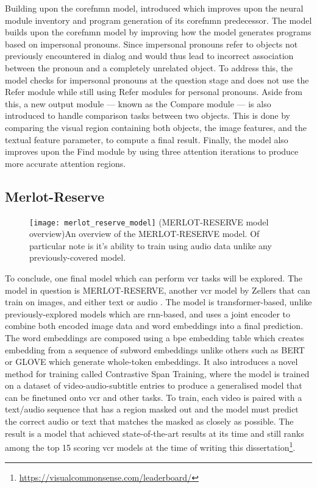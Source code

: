Building upon the \gls{corefnmn} model, \citeauthor{cho_visual_2021} introduced \cite{cho_visual_2021} which improves upon the neural module inventory and program generation of its \gls{corefnmn} predecessor.
The model builds upon the \gls{corefnmn} model by improving how the model generates programs based on impersonal pronouns.
Since impersonal pronouns refer to objects not previously encountered in dialog and would thus lead to incorrect association between the pronoun and a completely unrelated object.
To address this, the model checks for impersonal pronouns at the question stage and does not use the Refer module while still using Refer modules for personal pronouns.
Aside from this, a new output module --- known as the Compare module --- is also introduced to handle comparison tasks between two objects.
This is done by comparing the visual region containing both objects, the image features, and the textual feature parameter, to compute a final result.
Finally, the model also improves upon the Find module by using three attention iterations to produce more accurate attention regions.

\subsection{Merlot-Reserve}
\label{subsec:merlot_reserve}

\begin{figure}[htbp]
    \centering
    \texttt{[image: merlot\_reserve\_model]}
    \captionsource(MERLOT-RESERVE model overview){An overview of the MERLOT-RESERVE model. Of particular note is it's ability to train using audio data unlike any previously-covered model. \label{fig:merlot_reserve_model_overview}}{\citeauthor{zellers_merlot_2022}\cite{zellers_merlot_2022}}
\end{figure}

To conclude, one final model which can perform \gls{vcr} tasks will be explored.
The model in question is MERLOT-RESERVE, another \gls{vcr} model by Zellers that can train on images, and either text or audio \cite{zellers_merlot_2022}.
The model is transformer-based, unlike previously-explored models which are \gls{rnn}-based, and uses a joint encoder to combine both encoded image data and word embeddings into a final prediction.
The word embeddings are composed using a \gls{bpe} embedding table which creates embedding from a sequence of subword embeddings unlike others such as BERT or GLOVE which generate whole-token embeddings\cite{heinzerling_bpemb_2018}.
It also introduces a novel method for training called Contrastive Span Training, where the model is trained on a dataset of video-audio-subtitle entries to produce a generalised model that can be finetuned onto \gls{vcr} and other tasks\cite{zellers_merlot_2022}.
To train, each video is paired with a text/audio sequence that has a region masked out and the model must predict the correct audio or text that matches the masked as closely as possible.
The result is a model that achieved state-of-the-art results at its time\cite{zellers_merlot_2022} and still ranks among the top 15 scoring \gls{vcr} models at the time of writing this dissertation\footnote[1]{\url{https://visualcommonsense.com/leaderboard/}}.
